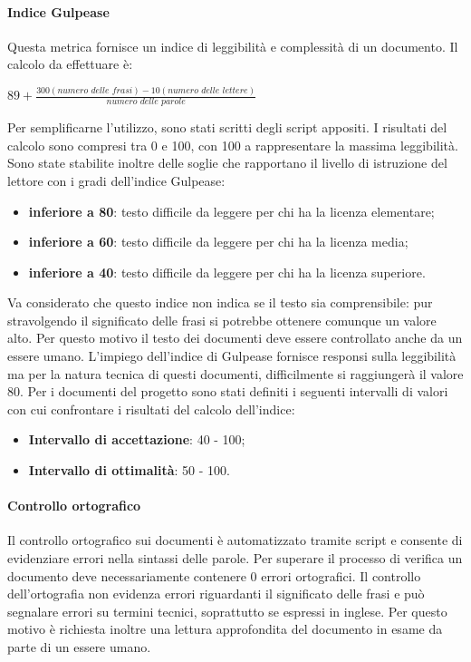 \paragraph{Indice Gulpease}
Questa metrica fornisce un indice di leggibilità e complessità di un documento. Il calcolo da effettuare è:\\
\begin{center}
${89 + \frac{300(\textit{numero delle frasi}) - 10(\textit{numero delle lettere})}{\textit{numero delle parole}}}$
\end{center}
Per semplificarne l’utilizzo, sono stati scritti degli script appositi. I risultati del calcolo sono compresi tra 0 e 100, con 100 a rappresentare la massima leggibilità. Sono state stabilite inoltre delle soglie che rapportano il livello di istruzione del lettore con i gradi dell’indice Gulpease:
\begin{itemize}
\item \textbf{inferiore a 80}: testo difficile da leggere per chi ha la licenza elementare;
\item \textbf{inferiore a 60}: testo difficile da leggere per chi ha la licenza media;
\item \textbf{inferiore a 40}: testo difficile da leggere per chi ha la licenza superiore.
\end{itemize}
Va considerato che questo indice non indica se il testo sia comprensibile: pur stravolgendo il significato delle frasi si potrebbe ottenere comunque un valore alto. Per questo motivo il testo dei documenti deve essere controllato anche da un essere umano. L’impiego dell’indice di Gulpease fornisce responsi sulla leggibilità ma per la natura tecnica di questi documenti, difficilmente si raggiungerà il valore 80. Per i documenti del progetto sono stati definiti i seguenti intervalli di valori con cui confrontare i risultati del calcolo dell’indice:
\begin{itemize}
\item \textbf{Intervallo di accettazione}: 40 - 100;
\item \textbf{Intervallo di ottimalità}: 50 - 100.
\end{itemize}

\paragraph{Controllo ortografico}
Il controllo ortografico sui documenti è automatizzato tramite script e consente di evidenziare errori nella sintassi delle parole. Per superare il processo di verifica un documento deve necessariamente contenere 0 errori ortografici. Il controllo dell’ortografia non evidenza errori riguardanti il significato delle frasi e può segnalare errori su termini tecnici, soprattutto se espressi in inglese. Per questo motivo è richiesta inoltre una lettura approfondita del documento in esame da parte di un essere umano.

